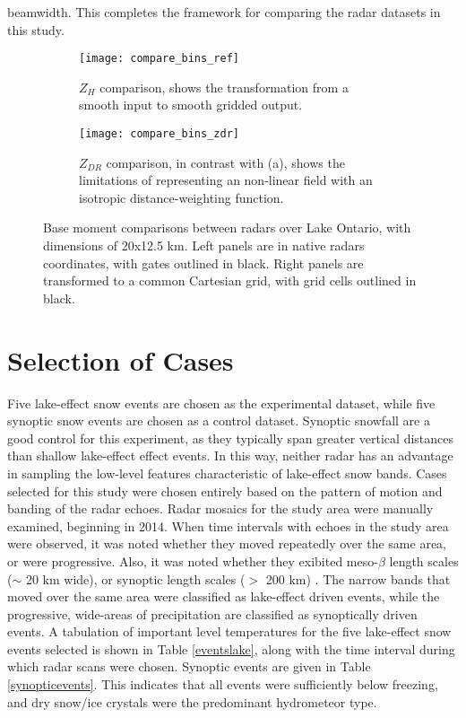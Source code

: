beamwidth. This completes the framework for comparing the radar datasets in this study.
\begin{figure}[t!]
\centering
   \begin{subfigure}{1.0\textwidth} \centering
     \texttt{[image: compare\_bins\_ref]}
     \caption{$Z_H$ comparison, shows the transformation from a smooth input to smooth gridded output.}\label{fig:compare_ref}
   \end{subfigure}
   \begin{subfigure}{1.0\textwidth} \centering
     \texttt{[image: compare\_bins\_zdr]}
     \caption{$Z_{DR}$ comparison, in contrast with (a), shows the limitations of representing an non-linear field with an isotropic distance-weighting
     function. }\label{fig:compare_zdr}
   \end{subfigure}
\caption{Base moment comparisons between radars over Lake Ontario, with dimensions of 20x12.5 km. Left panels are in native radars coordinates, with gates
outlined in black. Right panels are transformed to a common Cartesian grid, with grid cells outlined in black.} \label{fig:compare_bins}
\end{figure}

\section{Selection of Cases}
Five lake-effect snow events are chosen as the experimental dataset, while five synoptic snow events are chosen as a control dataset. Synoptic snowfall are a
good control for this experiment, as they typically span greater vertical distances than shallow lake-effect effect events. In this way, neither radar has an
advantage in sampling the low-level features characteristic of lake-effect snow bands.
Cases selected for this study were chosen entirely based on the pattern of motion and banding of the radar
echoes. Radar mosaics for the study area were
manually examined, beginning in 2014. When time intervals with echoes in the study area were observed, it was
noted whether they moved repeatedly over the same area,
or were progressive.  Also, it was noted whether they exibited meso-$\beta$ length scales ($\sim$ 20 km wide),
or synoptic length scales ($>$ 200 km) \citep{Orlanski1975}. The narrow bands that moved over the same area
were classified as lake-effect driven events, while the progressive, wide-areas of precipitation are classified as
synoptically driven events. A tabulation of important level temperatures for the five lake-effect snow events selected
is shown in Table \ref{eventslake}, along with the time interval during which radar scans were chosen. Synoptic
events are given in Table \ref{synopticevents}. This indicates that all events were sufficiently below freezing, and
dry snow/ice crystals were the predominant hydrometeor type.


